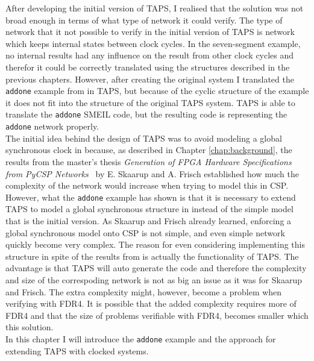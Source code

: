 After developing the initial version of TAPS, I realised that the solution was not broad enough in terms of what type of network it could verify. The type of network that it not possible to verify in the initial version of TAPS is network which keeps internal states between clock cycles. In the seven-segment example, no internal results had any influence on the result from other clock cycles and therefor it could be correctly translated using the structures described in the previous chapters.
However, after creating the original system I translated the \texttt{addone} example from \cite{smeil} in TAPS, but because of the cyclic structure of the example it does not fit into the structure of the original TAPS system. TAPS is able to translate the \texttt{addone} SMEIL code, but the resulting \cspm{} code is representing the \texttt{addone} network properly.\\

The initial idea behind the design of TAPS was to avoid modeling a global synchronous clock in \cspm{} because, as described in Chapter \ref{chap:background}, the results from the master's thesis \textit{Generation of FPGA Hardware
Specifications from PyCSP Networks}~\cite{Skaarup14} by E. Skaarup and A. Frisch established how much the complexity of the network would increase when trying to model this in CSP.\\

However, what the \texttt{addone} example has shown is that it is necessary to extend TAPS to model a global synchronous structure in \cspm{} instead of the simple model that is the initial version. As Skaarup and Frisch already learned, enforcing a global synchronous model onto CSP is not simple, and even simple network quickly become very complex. The reason for even considering implementing this structure in spite of the results from \cite{Skaarup14} is actually the functionality of TAPS. The advantage is that TAPS will auto generate the \cspm{} code and therefore the complexity and size of the correspoding \cspm{} network is not as big an issue as it was for Skaarup and Frisch. The extra complexity might, however, become a problem when verifying with FDR4. It is possible that the added complexity requires more of FDR4 and that the size of problems verifiable with FDR4, becomes smaller which this solution. \\

In this chapter I will introduce the \texttt{addone} example and the approach for extending TAPS with clocked systems.




